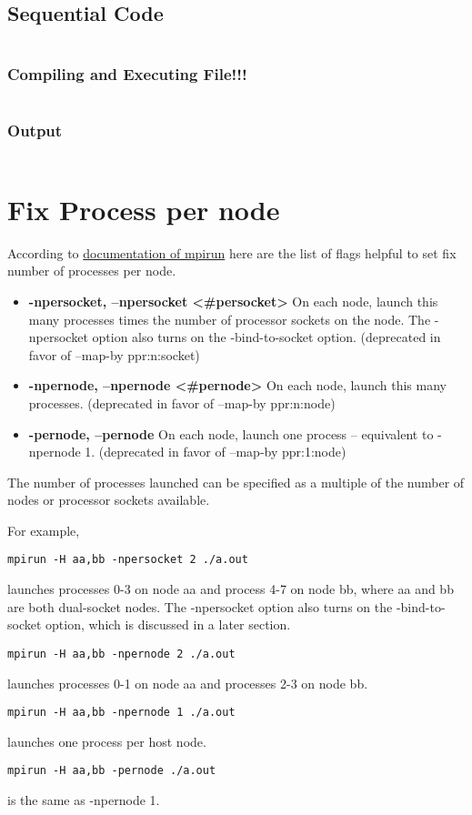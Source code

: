 \documentclass[paper=letter, fontsize=12pt]{article}
\begin{document}
\subsection{Sequential Code}
\inputminted{c}{../src/main.c}

\subsubsection{Compiling and Executing File!!!}
\inputminted{bash}{../src/run.sh}

\subsubsection{Output}
\inputminted{text}{../src/output.txt}

\section{Fix Process per node}
According to \href{https://www.open-mpi.org/doc/v3.1/man1/mpirun.1.php}{documentation of mpirun} here are the list of flags helpful to set fix number of processes per node.

\begin{itemize}
    \item \textbf{-npersocket, --npersocket <\#persocket>}
    On each node, launch this many processes times the number of processor sockets on the node. The -npersocket option also turns on the -bind-to-socket option. (deprecated in favor of --map-by ppr:n:socket) 
    \item \textbf{-npernode, --npernode <\#pernode>}
    On each node, launch this many processes. (deprecated in favor of --map-by ppr:n:node) 
    \item \textbf{-pernode, --pernode}
    On each node, launch one process -- equivalent to -npernode 1. (deprecated in favor of --map-by ppr:1:node)
\end{itemize}
The number of processes launched can be specified as a multiple of the number of nodes or processor sockets available. 
 
For example,
\begin{verbatim}
mpirun -H aa,bb -npersocket 2 ./a.out
\end{verbatim}
launches processes 0-3 on node aa and process 4-7 on node bb, where aa and bb are both dual-socket nodes. The -npersocket option also turns on the -bind-to-socket option, which is discussed in a later section.
 
\begin{verbatim}
mpirun -H aa,bb -npernode 2 ./a.out
\end{verbatim}
launches processes 0-1 on node aa and processes 2-3 on node bb. 

\begin{verbatim}
mpirun -H aa,bb -npernode 1 ./a.out
\end{verbatim}
launches one process per host node. 

\begin{verbatim}
mpirun -H aa,bb -pernode ./a.out
\end{verbatim}
is the same as -npernode 1. 
\end{document}
